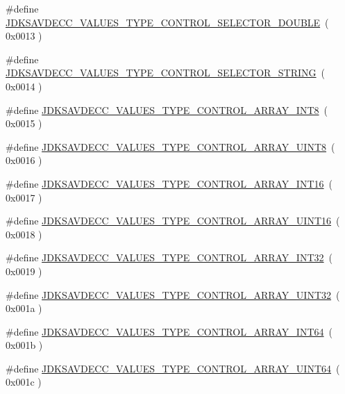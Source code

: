 \begin{DoxyCompactItemize}
\item 
\#define \hyperlink{group__values__type_gae205562b17c703b5934f6f19fbeabd53}{J\+D\+K\+S\+A\+V\+D\+E\+C\+C\+\_\+\+V\+A\+L\+U\+E\+S\+\_\+\+T\+Y\+P\+E\+\_\+\+C\+O\+N\+T\+R\+O\+L\+\_\+\+S\+E\+L\+E\+C\+T\+O\+R\+\_\+\+D\+O\+U\+B\+LE}~( 0x0013 )
\item 
\#define \hyperlink{group__values__type_ga79999bb895f47f4e8e6b193b5c031265}{J\+D\+K\+S\+A\+V\+D\+E\+C\+C\+\_\+\+V\+A\+L\+U\+E\+S\+\_\+\+T\+Y\+P\+E\+\_\+\+C\+O\+N\+T\+R\+O\+L\+\_\+\+S\+E\+L\+E\+C\+T\+O\+R\+\_\+\+S\+T\+R\+I\+NG}~( 0x0014 )
\item 
\#define \hyperlink{group__values__type_ga2a6d5b218d6751882d91df8bb792237a}{J\+D\+K\+S\+A\+V\+D\+E\+C\+C\+\_\+\+V\+A\+L\+U\+E\+S\+\_\+\+T\+Y\+P\+E\+\_\+\+C\+O\+N\+T\+R\+O\+L\+\_\+\+A\+R\+R\+A\+Y\+\_\+\+I\+N\+T8}~( 0x0015 )
\item 
\#define \hyperlink{group__values__type_ga6e184717a436400f2a2fde98b7577c5c}{J\+D\+K\+S\+A\+V\+D\+E\+C\+C\+\_\+\+V\+A\+L\+U\+E\+S\+\_\+\+T\+Y\+P\+E\+\_\+\+C\+O\+N\+T\+R\+O\+L\+\_\+\+A\+R\+R\+A\+Y\+\_\+\+U\+I\+N\+T8}~( 0x0016 )
\item 
\#define \hyperlink{group__values__type_ga09fe167e9b99470b32fec98c291064b0}{J\+D\+K\+S\+A\+V\+D\+E\+C\+C\+\_\+\+V\+A\+L\+U\+E\+S\+\_\+\+T\+Y\+P\+E\+\_\+\+C\+O\+N\+T\+R\+O\+L\+\_\+\+A\+R\+R\+A\+Y\+\_\+\+I\+N\+T16}~( 0x0017 )
\item 
\#define \hyperlink{group__values__type_gaf23581f14fd9ec7690d97f6f79597fbb}{J\+D\+K\+S\+A\+V\+D\+E\+C\+C\+\_\+\+V\+A\+L\+U\+E\+S\+\_\+\+T\+Y\+P\+E\+\_\+\+C\+O\+N\+T\+R\+O\+L\+\_\+\+A\+R\+R\+A\+Y\+\_\+\+U\+I\+N\+T16}~( 0x0018 )
\item 
\#define \hyperlink{group__values__type_gabfe0f4156d957f5ea758777941245c5d}{J\+D\+K\+S\+A\+V\+D\+E\+C\+C\+\_\+\+V\+A\+L\+U\+E\+S\+\_\+\+T\+Y\+P\+E\+\_\+\+C\+O\+N\+T\+R\+O\+L\+\_\+\+A\+R\+R\+A\+Y\+\_\+\+I\+N\+T32}~( 0x0019 )
\item 
\#define \hyperlink{group__values__type_gaa3d8b61298443c7f3bfdb65ddc4732a3}{J\+D\+K\+S\+A\+V\+D\+E\+C\+C\+\_\+\+V\+A\+L\+U\+E\+S\+\_\+\+T\+Y\+P\+E\+\_\+\+C\+O\+N\+T\+R\+O\+L\+\_\+\+A\+R\+R\+A\+Y\+\_\+\+U\+I\+N\+T32}~( 0x001a )
\item 
\#define \hyperlink{group__values__type_gabe1e815238d066a604ec0c69dbdcb00f}{J\+D\+K\+S\+A\+V\+D\+E\+C\+C\+\_\+\+V\+A\+L\+U\+E\+S\+\_\+\+T\+Y\+P\+E\+\_\+\+C\+O\+N\+T\+R\+O\+L\+\_\+\+A\+R\+R\+A\+Y\+\_\+\+I\+N\+T64}~( 0x001b )
\item 
\#define \hyperlink{group__values__type_ga58f2117277d0fd2aff56d6759d07efb8}{J\+D\+K\+S\+A\+V\+D\+E\+C\+C\+\_\+\+V\+A\+L\+U\+E\+S\+\_\+\+T\+Y\+P\+E\+\_\+\+C\+O\+N\+T\+R\+O\+L\+\_\+\+A\+R\+R\+A\+Y\+\_\+\+U\+I\+N\+T64}~( 0x001c )

\end{DoxyCompactItemize}

